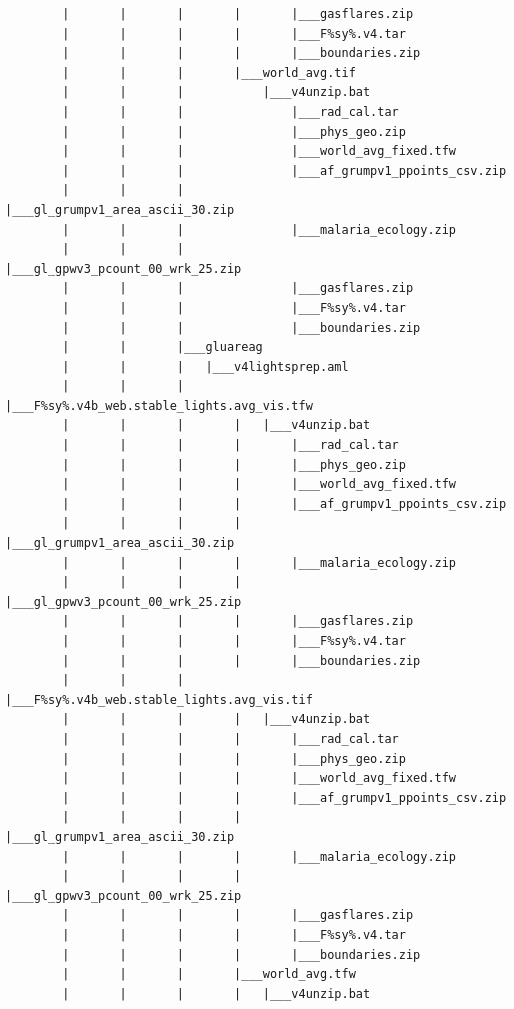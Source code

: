 \documentclass[]{book}
\begin{document}
\begin{verbatim}
        |       |       |       |       |___gasflares.zip
        |       |       |       |       |___F%sy%.v4.tar
        |       |       |       |       |___boundaries.zip
        |       |       |       |___world_avg.tif
        |       |       |           |___v4unzip.bat
        |       |       |               |___rad_cal.tar
        |       |       |               |___phys_geo.zip
        |       |       |               |___world_avg_fixed.tfw
        |       |       |               |___af_grumpv1_ppoints_csv.zip
        |       |       |               |___gl_grumpv1_area_ascii_30.zip
        |       |       |               |___malaria_ecology.zip
        |       |       |               |___gl_gpwv3_pcount_00_wrk_25.zip
        |       |       |               |___gasflares.zip
        |       |       |               |___F%sy%.v4.tar
        |       |       |               |___boundaries.zip
        |       |       |___gluareag
        |       |       |   |___v4lightsprep.aml
        |       |       |       |___F%sy%.v4b_web.stable_lights.avg_vis.tfw
        |       |       |       |   |___v4unzip.bat
        |       |       |       |       |___rad_cal.tar
        |       |       |       |       |___phys_geo.zip
        |       |       |       |       |___world_avg_fixed.tfw
        |       |       |       |       |___af_grumpv1_ppoints_csv.zip
        |       |       |       |       |___gl_grumpv1_area_ascii_30.zip
        |       |       |       |       |___malaria_ecology.zip
        |       |       |       |       |___gl_gpwv3_pcount_00_wrk_25.zip
        |       |       |       |       |___gasflares.zip
        |       |       |       |       |___F%sy%.v4.tar
        |       |       |       |       |___boundaries.zip
        |       |       |       |___F%sy%.v4b_web.stable_lights.avg_vis.tif
        |       |       |       |   |___v4unzip.bat
        |       |       |       |       |___rad_cal.tar
        |       |       |       |       |___phys_geo.zip
        |       |       |       |       |___world_avg_fixed.tfw
        |       |       |       |       |___af_grumpv1_ppoints_csv.zip
        |       |       |       |       |___gl_grumpv1_area_ascii_30.zip
        |       |       |       |       |___malaria_ecology.zip
        |       |       |       |       |___gl_gpwv3_pcount_00_wrk_25.zip
        |       |       |       |       |___gasflares.zip
        |       |       |       |       |___F%sy%.v4.tar
        |       |       |       |       |___boundaries.zip
        |       |       |       |___world_avg.tfw
        |       |       |       |   |___v4unzip.bat

\end{verbatim}
\end{document}
